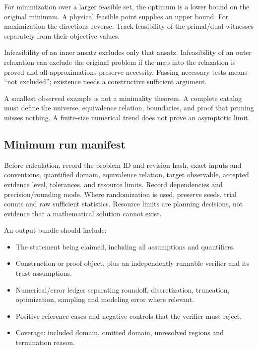 \documentclass[
  11pt,
]{article}
\providecommand{\tightlist}{%
  \setlength{\itemsep}{0pt}\setlength{\parskip}{0pt}}
\begin{document}
For minimization over a larger feasible set, the optimum is a lower
bound on the original minimum. A physical feasible point supplies an
upper bound. For maximization the directions reverse. Track feasibility
of the primal/dual witnesses separately from their objective values.

Infeasibility of an inner ansatz excludes only that ansatz.
Infeasibility of an outer relaxation can exclude the original problem if
the map into the relaxation is proved and all approximations preserve
necessity. Passing necessary tests means ``not excluded''; existence
needs a constructive sufficient argument.

A smallest observed example is not a minimality theorem. A complete
catalog must define the universe, equivalence relation, boundaries, and
proof that pruning misses nothing. A finite-size numerical trend does
not prove an asymptotic limit.

\subsection{Minimum run manifest}

Before calculation, record the problem ID and revision hash, exact
inputs and conventions, quantified domain, equivalence relation, target
observable, accepted evidence level, tolerances, and resource limits.
Record dependencies and precision/rounding mode. Where randomization is
used, preserve seeds, trial counts and raw sufficient statistics.
Resource limits are planning decisions, not evidence that a mathematical
solution cannot exist.

An output bundle should include:

\begin{itemize}
\tightlist
\item
  The statement being claimed, including all assumptions and
  quantifiers.
\item
  Construction or proof object, plus an independently runnable verifier
  and its trust assumptions.
\item
  Numerical/error ledger separating roundoff, discretization,
  truncation, optimization, sampling and modeling error where relevant.
\item
  Positive reference cases and negative controls that the verifier must
  reject.
\item
  Coverage: included domain, omitted domain, unresolved regions and
  termination reason.
\end{itemize}
\end{document}
